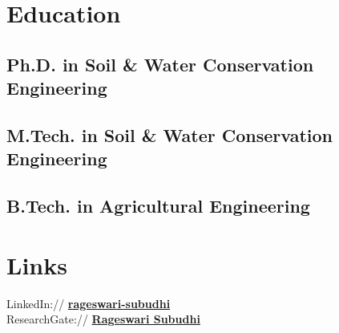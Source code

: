 \documentclass[]{deedy-resume-openfont}
\begin{document}
%
%
\lastupdated

%
%

%
%

\begin{minipage}[t]{0.33\textwidth} 


\section{Education} 

\subsection{Ph.D. in Soil \& Water Conservation Engineering}
\sectionsep

\subsection{M.Tech. in Soil \& Water Conservation Engineering}
\sectionsep

\subsection{B.Tech. in Agricultural Engineering}
\sectionsep


\section{Links} 
LinkedIn:// \href{https://www.linkedin.com/in/rageswari-subudhi-250812179/}{\bf rageswari-subudhi} \\
ResearchGate:// \href{https://www.researchgate.net/scientific-contributions/2135966431_Rageswari_Subudhi}{\bf Rageswari Subudhi} \\


\end{minipage}
\end{document}
